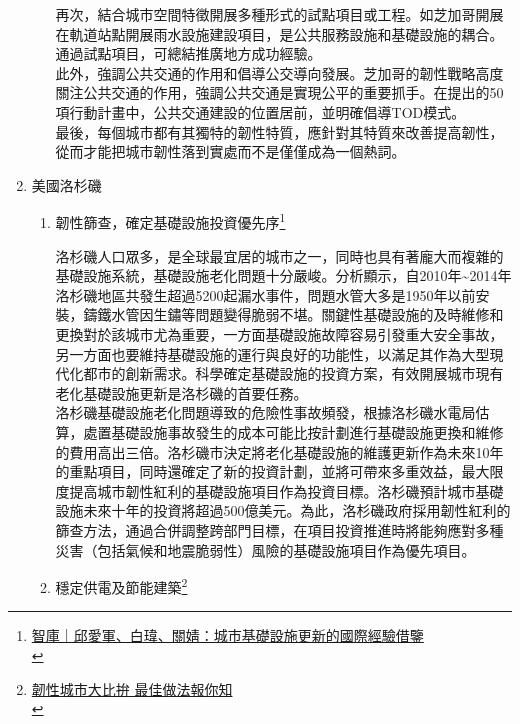 \documentclass[a4paper,12pt]{article}
\begin{document}
\begin{enumerate}
\begin{enumerate}
再次，結合城市空間特徵開展多種形式的試點項目或工程。如芝加哥開展在軌道站點開展雨水設施建設項目，是公共服務設施和基礎設施的耦合。通過試點項目，可總結推廣地方成功經驗。\\

此外，強調公共交通的作用和倡導公交導向發展。芝加哥的韌性戰略高度關注公共交通的作用，強調公共交通是實現公平的重要抓手。在提出的50項行動計畫中，公共交通建設的位置居前，並明確倡導TOD模式。\\

最後，每個城市都有其獨特的韌性特質，應針對其特質來改善提高韌性，從而才能把城市韌性落到實處而不是僅僅成為一個熱詞。\\
\end{enumerate}

\item 美國洛杉磯
\label{sec:orged09540}

\begin{enumerate}
\item 韌性篩查，確定基礎設施投資優先序\footnote{\href{https://news.sina.com.tw/article/20200503/35052898.html}{智庫｜邱愛軍、白瑋、關婧：城市基礎設施更新的國際經驗借鑒}\\\label{orgea34d39}}
\label{sec:org45b7da9}

洛杉磯人口眾多，是全球最宜居的城市之一，同時也具有著龐大而複雜的基礎設施系統，基礎設施老化問題十分嚴峻。分析顯示，自2010年\textasciitilde{}2014年洛杉磯地區共發生超過5200起漏水事件，問題水管大多是1950年以前安裝，鑄鐵水管因生鏽等問題變得脆弱不堪。關鍵性基礎設施的及時維修和更換對於該城市尤為重要，一方面基礎設施故障容易引發重大安全事故，另一方面也要維持基礎設施的運行與良好的功能性，以滿足其作為大型現代化都市的創新需求。科學確定基礎設施的投資方案，有效開展城市現有老化基礎設施更新是洛杉磯的首要任務。\\

洛杉磯基礎設施老化問題導致的危險性事故頻發，根據洛杉磯水電局估算，處置基礎設施事故發生的成本可能比按計劃進行基礎設施更換和維修的費用高出三倍。洛杉磯市決定將老化基礎設施的維護更新作為未來10年的重點項目，同時還確定了新的投資計劃，並將可帶來多重效益，最大限度提高城市韌性紅利的基礎設施項目作為投資目標。洛杉磯預計城市基礎設施未來十年的投資將超過500億美元。為此，洛杉磯政府採用韌性紅利的篩查方法，通過合併調整跨部門目標，在項目投資推進時將能夠應對多種災害（包括氣候和地震脆弱性）風險的基礎設施項目作為優先項目。\\

\item 穩定供電及節能建築\footnote{\href{https://www.delta-foundation.org.tw/blogdetail/3021}{韌性城市大比拚 最佳做法報你知}\\}
\label{sec:org07e4d68}


\end{enumerate}
\end{enumerate}
\end{document}
